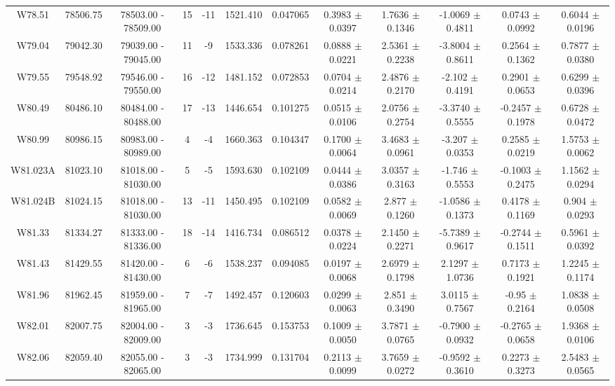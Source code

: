 \documentclass{article}
\begin{document}
\begin{table}[h]
{\begin{tabular}{|c|c|c|c|c|c|c|c|c|c|c|c|}
W78.51 & 78506.75 & 78503.00 - 78509.00 & 15 & -11 & 1521.410 & 0.047065 & 0.3983 $\pm$ 0.0397 & 1.7636 $\pm$ 0.1346 & -1.0069 $\pm$ 0.4811 & 0.0743 $\pm$ 0.0992 & 0.6044 $\pm$ 0.0196 \\
W79.04 & 79042.30 & 79039.00 - 79045.00 & 11 & -9 & 1533.336 & 0.078261 & 0.0888 $\pm$ 0.0221 & 2.5361 $\pm$ 0.2238 & -3.8004 $\pm$ 0.8611 & 0.2564 $\pm$ 0.1362 & 0.7877 $\pm$ 0.0380 \\
W79.55 & 79548.92 & 79546.00 - 79550.00 & 16 & -12 & 1481.152 & 0.072853 & 0.0704 $\pm$ 0.0214 &  2.4876 $\pm$ 0.2170 & -2.102 $\pm$ 0.4191 & 0.2901 $\pm$ 0.0653 & 0.6299 $\pm$ 0.0396 \\
W80.49 & 80486.10 & 80484.00 - 80488.00 & 17 & -13 & 1446.654 & 0.101275 & 0.0515 $\pm$ 0.0106 & 2.0756 $\pm$ 0.2754 & -3.3740 $\pm$ 0.5555 & -0.2457 $\pm$ 0.1978 & 0.6728 $\pm$ 0.0472 \\
W80.99 & 80986.15 & 80983.00 - 80989.00 & 4 & -4 & 1660.363 & 0.104347 & 0.1700 $\pm$ 0.0064 & 3.4683 $\pm$ 0.0961 & -3.207 $\pm$ 0.0353 & 0.2585 $\pm$ 0.0219 & 1.5753 $\pm$ 0.0062 \\
W81.023A & 81023.10 & 81018.00 - 81030.00 & 5 & -5 & 1593.630 & 0.102109 & 0.0444 $\pm$ 0.0386 & 3.0357 $\pm$ 0.3163 & -1.746 $\pm$ 0.5553 & -0.1003 $\pm$ 0.2475 & 1.1562 $\pm$ 0.0294 \\
W81.024B & 81024.15 & 81018.00 - 81030.00 & 13 & -11 & 1450.495 & 0.102109 & 0.0582 $\pm$ 0.0069 & 2.877 $\pm$ 0.1260 & -1.0586 $\pm$ 0.1373 & 0.4178 $\pm$ 0.1169 & 0.904 $\pm$ 0.0293 \\
W81.33 & 81334.27 & 81333.00 - 81336.00 & 18 & -14 & 1416.734 & 0.086512 & 0.0378 $\pm$ 0.0224 &  2.1450 $\pm$ 0.2271 & -5.7389 $\pm$ 0.9617 & -0.2744 $\pm$ 0.1511 & 0.5961 $\pm$ 0.0392 \\
W81.43 & 81429.55 & 81420.00 - 81430.00 & 6 & -6 & 1538.237 & 0.094085 & 0.0197 $\pm$ 0.0068 & 2.6979 $\pm$ 0.1798 & 2.1297 $\pm$ 1.0736 & 0.7173 $\pm$ 0.1921 & 1.2245 $\pm$ 0.1174 \\
W81.96 & 81962.45 & 81959.00 - 81965.00 & 7 & -7 & 1492.457 & 0.120603 & 0.0299 $\pm$ 0.0063 &   2.851 $\pm$ 0.3490 & 3.0115 $\pm$ 0.7567 & -0.95 $\pm$ 0.2164 & 1.0838 $\pm$ 0.0508 \\
W82.01 & 82007.75 & 82004.00 - 82009.00 & 3 & -3 & 1736.645 & 0.153753 & 0.1009 $\pm$ 0.0050 & 3.7871 $\pm$ 0.0765 & -0.7900 $\pm$ 0.0932 & -0.2765 $\pm$ 0.0658 & 1.9368 $\pm$ 0.0106 \\
W82.06 & 82059.40 & 82055.00 - 82065.00 & 3 & -3 & 1734.999 & 0.131704 & 0.2113 $\pm$ 0.0099 & 3.7659 $\pm$ 0.0272 & -0.9592 $\pm$ 0.3610 & 0.2273 $\pm$ 0.3273 & 2.5483 $\pm$ 0.0565 \\

\end{tabular}}
\end{table}
\end{document}
